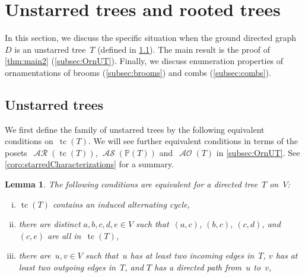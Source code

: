 \documentclass{amsart}
\newtheorem{lemma}[theorem]{Lemma}
\theoremstyle{definition}
\renewcommand{\c}[1]{\mathcal{#1}} %
\DeclareMathOperator{\tc}{tc} %
\DeclareMathOperator{\AOrn}{\c{AO}}  %
\DeclareMathOperator{\AReori}{\c{AR}}  %
\DeclareMathOperator{\ASour}{\mathcal{AS}}  %
\newcommand{\PP}{\mathbb P} %
\begin{document}

\section{Unstarred trees and rooted trees}
\label{sec:unstarredTrees}

In this section, we discuss the specific situation when the ground directed graph~$D$ is an unstarred tree~$T$ (defined in \cref{subsec:unstarredTrees}).
The main result is the proof of \cref{thm:main2} (\cref{subsec:OrnUT}).
Finally, we discuss enumeration properties of ornamentations of brooms (\cref{subsec:brooms}) and combs (\cref{subsec:combs}).


\subsection{Unstarred trees}
\label{subsec:unstarredTrees}


We first define the family of unstarred trees by the following equivalent conditions on~$\tc(T)$.
We will see further equivalent conditions in terms of the posets~$\AReori(\tc(T))$, $\ASour(\PP(T))$ and~$\AOrn(T)$ in \cref{subsec:OrnUT}.
See \cref{coro:starredCharacterizations} for a summary.

\begin{lemma}
\label{lem:starredCharacterization}
The following conditions are equivalent for a directed tree~$T$ on~$V$:
\begin{enumerate}[(i)]
\item $\tc(T)$ contains an induced alternating cycle,
\item there are distinct $a,b,c,d,e \in V$ such that~$(a,c)$, $(b,c)$, $(c,d)$, and~$(c,e)$ are all in~$\tc(T)$,
\item there are~$u,v \in V$ such that~$u$ has at least two incoming edges in~$T$, $v$ has at least two outgoing edges in~$T$, and $T$ has a directed path from~$u$ to~$v$,
\end{enumerate}
\end{lemma}
\end{document}
